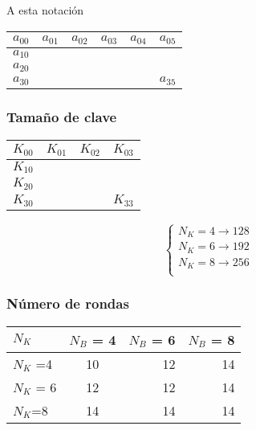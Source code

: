 A esta notación	


	\begin{center}
		
		\begin{tabular}{l | c | r | r | r | r}
			$a_{00}$ & $a_{01}$ & $a_{02}$ & $a_{03}$ & $a_{04}$ & $a_{05}$\\
			\hline
			$a_{10}$ &   &   &   &   &  \\
			\hline
			$a_{20}$ &   &   &   &   &  \\
			\hline
			$a_{30}$ &   &   &   &   & $a_{35}$
			
		\end{tabular}
	\end{center}


\subsubsection{Tamaño de clave}

	\begin{center}
		
		\begin{tabular}{l | c | r | r }
		$K_{00}$ & $K_{01}$ & $K_{02}$ & $K_{03}$\\
		\hline
		$K_{10}$ &  &  & \\
		\hline
		$K_{20}$ &  &  & \\
		\hline
		$K_{30}$ &  &  & $K_{33}$
		
		\end{tabular}
	\end{center}
	
		$$\begin{cases}
		N_K = 4 \rightarrow 128\\
		N_K = 6 \rightarrow 192\\
		N_K = 8 \rightarrow 256\\
		\end{cases}$$
		
\subsubsection{Número de rondas}
	\begin{center}
		
		\begin{tabular}{l | c | r | r }
		$N_K$ & $N_B$ = 4 & $N_B$ = 6 & $N_B$ = 8\\
		\hline
		$N_K$ =4 &  10 & 12 & 14\\
		\hline
		$N_K$ = 6 & 12 & 12 & 14\\
		\hline
		$N_K$=8 & 14 & 14 & 14
		
		\end{tabular}
	\end{center}

